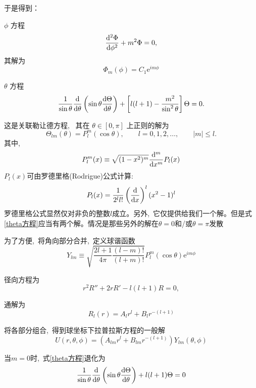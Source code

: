 于是得到：

{$\phi$ 方程}
\begin{equation}
\frac{\dif ^2\Phi}{\dif \phi^2} + m^2 \Phi = 0,
\end{equation}
其解为
\[
\Phi_m(\phi) = C_1\mathrm{e}^{i m \phi}
\]

{$\theta$ 方程}
\begin{equation}
\frac{1}{\sin\theta}
\frac{\dif }{\dif \theta}
\left(
\sin\theta \frac{\dif \Theta}{\dif \theta}
\right)
+
\left[
l(l+1)
-
\frac{m^2}{\sin^2\theta}
\right]\Theta
=0.\label{theta方程}
\end{equation}

这是{关联勒让德方程}, \,
其在 $\theta\in[0,\pi]$ 上正则的解为
\[
\Theta_{lm}(\theta)=P_l^m(\cos\theta),\qquad
l=0,1,2,\dots,
\qquad
|m|\le l.
\]
其中,
\begin{equation}
    P_l^m(x)\equiv\sqrt{(1-x^2)^m}\frac{\dif^m}{\dif x^m}P_l(x)
\end{equation}
$P_l(x)$可由罗德里格(Rodrigue)公式计算:
\begin{equation}
    P_l(x)=\frac{1}{2^ll!}\left(\frac{\dif}{\dif x}\right)^l(x^2-1)^l
\end{equation}
罗德里格公式显然仅对非负的整数$l$成立。另外, \,它仅提供给我们一个解。但是式\ref{theta方程}应当有两个解。情况是那些另外的解在$\theta=0$和/或$\theta=\pi$发散



为了方便, \,将角向部分合并, \,定义球谐函数
\begin{equation}
    Y_{lm}\equiv\sqrt{\frac{2l+1}{4\pi}\frac{(l-m)!}{(l+m)!}}P_l^m(\cos\theta) \mathrm{e}^{i m \phi}
\end{equation}

径向方程为
\[
r^2 R'' + 2r R' - l(l+1)R = 0,
\]

通解为
\begin{equation}
R_l(r)
=
A_l r^l
+
B_l r^{-(l+1)}
\end{equation}




将各部分组合, \,得到球坐标下拉普拉斯方程的一般解
\begin{equation}
U(r,\theta,\phi)
=
\left(
A_{lm} r^l
+
B_{lm} r^{-(l+1)}
\right)
Y_{lm}(\theta,\phi)
\end{equation}

当$m=0$时, \,式\ref{theta方程}退化为
\begin{equation}
\frac{1}{\sin\theta}
\frac{\dif }{\dif \theta}
\left(
\sin\theta \frac{\dif \Theta}{\dif \theta}
\right)
+
l(l+1)\Theta
=0\label{退化theta方程}
\end{equation}

